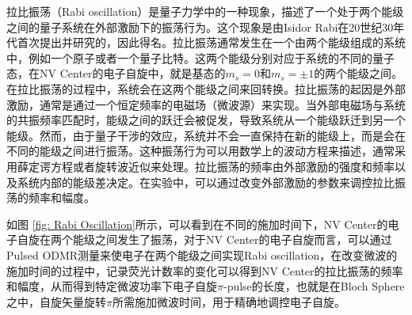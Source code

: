 \documentclass[type = bachelor]{whu-thesis}
\begin{document}
拉比振荡（Rabi oscillation）是量子力学中的一种现象，描述了一个处于两个能级之间的量子系统在外部激励下的振荡行为。这个现象是由Isidor Rabi在20世纪30年代首次提出并研究的，因此得名。拉比振荡通常发生在一个由两个能级组成的系统中，例如一个原子或者一个量子比特。这两个能级分别对应于系统的不同的量子态，在NV Center的电子自旋中，就是基态的$m_s=0$和$m_s = \pm1$的两个能级之间。在拉比振荡的过程中，系统会在这两个能级之间来回转换。拉比振荡的起因是外部激励，通常是通过一个恒定频率的电磁场（微波源）来实现。当外部电磁场与系统的共振频率匹配时，能级之间的跃迁会被促发，导致系统从一个能级跃迁到另一个能级。然而，由于量子干涉的效应，系统并不会一直保持在新的能级上，而是会在不同的能级之间进行振荡。这种振荡行为可以用数学上的波动方程来描述，通常采用薛定谔方程或者旋转波近似来处理。拉比振荡的频率由外部激励的强度和频率以及系统内部的能级差决定。在实验中，可以通过改变外部激励的参数来调控拉比振荡的频率和幅度。

如图 \ref{fig: Rabi Oscillation}所示，可以看到在不同的施加时间下，NV Center的电子自旋在两个能级之间发生了振荡，对于NV Center的电子自旋而言，可以通过Pulsed ODMR测量来使电子在两个能级之间实现Rabi oscillation，在改变微波的施加时间的过程中，记录荧光计数率的变化可以得到NV Center的拉比振荡的频率和幅度，从而得到特定微波功率下电子自旋$\pi$-pulse的长度，也就是在Bloch Sphere之中，自旋矢量旋转$\pi$所需施加微波时间，用于精确地调控电子自旋。
\end{document}
